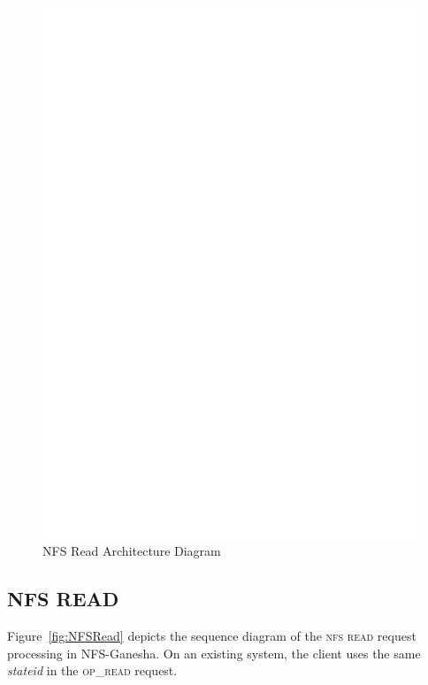 \begin{figure}
\centering
\includegraphics[scale=0.7]{figures/Read.eps}
\caption{NFS Read Architecture Diagram}
\label{fig:NFSReadArch}
\end{figure}

\subsection{NFS READ}

Figure~\ref{fig:NFSRead} depicts the sequence diagram of the \textsc{nfs read} request processing in NFS-Ganesha. On an existing system, the client uses the same \textit{stateid} in the \textsc{op\_read} request. 

